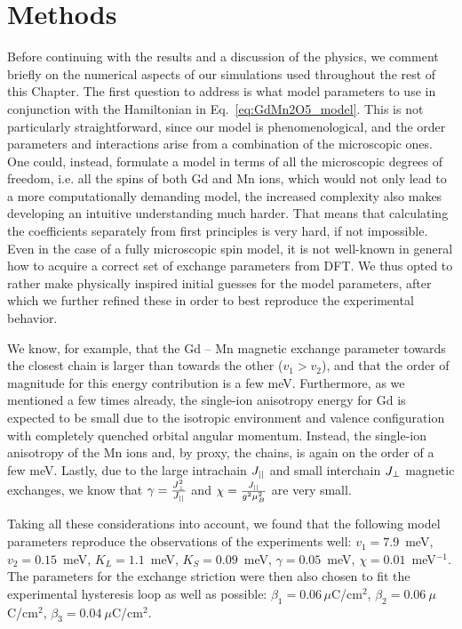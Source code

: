 \section{Methods \label{sec:GdMn2O5_methods}}
Before continuing with the results and a discussion of the physics, we comment briefly on the numerical aspects of our simulations used throughout the rest of this Chapter.
The first question to address is what model parameters to use in conjunction with the Hamiltonian in Eq.~\eqref{eq:GdMn2O5_model}.
This is not particularly straightforward, since our model is phenomenological, and the order parameters and interactions arise from a combination of the microscopic ones.
One could, instead, formulate a model in terms of all the microscopic degrees of freedom, i.e. all the spins of both Gd and Mn ions, which would not only lead to a more computationally demanding model, the increased complexity also makes developing an intuitive understanding much harder.
That means that calculating the coefficients separately from first principles is very hard, if not impossible. Even in the case of a fully microscopic spin model, it is not well-known in general how to acquire a correct set of exchange parameters from \gls{DFT}.
We thus opted to rather make physically inspired initial guesses for the model parameters, after which we further refined these in order to best reproduce the experimental behavior.

We know, for example, that the Gd -- Mn magnetic exchange parameter towards the closest chain is larger than towards the other ($v_1>v_2$), and that the order of magnitude for this energy contribution is a few meV.
Furthermore, as we mentioned a few times already, the single-ion anisotropy energy for Gd is expected to be small due to the isotropic environment and valence configuration with completely quenched orbital angular momentum.
Instead, the single-ion anisotropy of the Mn ions and, by proxy, the chains, is again on the order of a few meV.
Lastly, due to the large intrachain $J_{||}$ and small interchain $J_{\perp}$ magnetic exchanges, we know that $\gamma = \frac{J_{\perp}^2}{J_{||}}$ and $\chi = \frac{J_{||}}{g^2\mu_B^2}$ are very small.

Taking all these considerations into account, we found that the following model parameters reproduce the observations of the experiments well:  
$v_1 = 7.9$~meV, $v_2 = 0.15$~meV, $K_L = 1.1$~meV, $K_S = 0.09$~meV, $\gamma = 0.05$~meV, $\chi=0.01$~meV$^{-1}$.
The parameters for the exchange striction were then also chosen to fit the experimental hysteresis loop as well as possible:
${\beta_1 = 0.06\,\mu}$C/cm$^2$, $\beta_2 = 0.06\:\mu$C/cm$^2$, $\beta_3 = 0.04\:\mu$C/cm$^2$.

